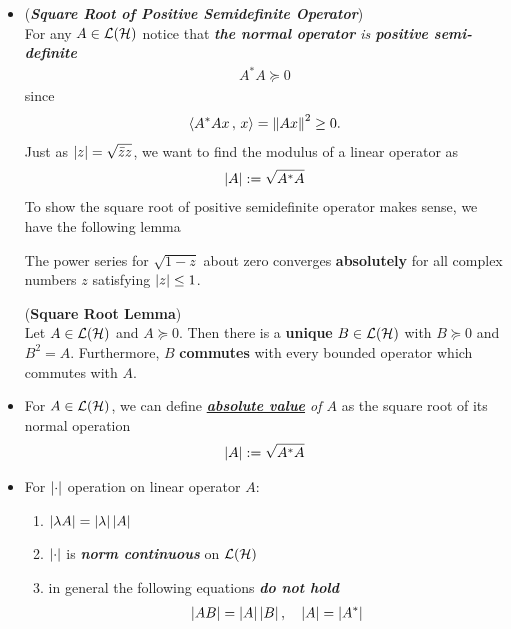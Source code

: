 \documentclass[11pt]{article}
\begin{document}
\begin{itemize}
\item \begin{remark} (\emph{\textbf{Square Root of Positive Semidefinite Operator}})\\
For any $A \in {\mathcal L}({\mathcal H})$ notice that \emph{\textbf{the normal operator} is \textbf{positive semi-definite}}
\begin{align*}
A^{*}A \succeq 0
\end{align*}
since 
\begin{align*}
\left\langle A^{*}Ax\,,\, x \right\rangle = \left\|Ax\right\|_{}^2 \ge 0.
\end{align*}
Just as $\left\lvert z \right\rvert = \sqrt{\bar{z}z}$, we want to find the modulus of a linear operator as
\begin{align*}
\left\lvert A \right\rvert := \sqrt{A^{*}A }
\end{align*} 
To show the square root of positive semidefinite operator makes sense, we have the following lemma
\begin{lemma}
The power series for $\sqrt{1 - z}$ about zero converges \textbf{absolutely} for all complex numbers $z$ satisfying $\left\lvert z \right\rvert \le 1$. 
\end{lemma}

\begin{theorem} (\textbf{Square Root Lemma})  \citep{reed1980methods}\\ 
Let $A \in {\mathcal L}({\mathcal H})$ and $A \succeq 0$. Then there is a \textbf{unique} $B \in {\mathcal L}({\mathcal H})$ with $B \succeq 0$ and $B^2 = A$. Furthermore, $B$ 
\textbf{commutes} with every bounded operator which commutes with $A$. 
\end{theorem}
\end{remark}

\item \begin{definition}
For $A \in {\mathcal L}({\mathcal H})$, we can define \emph{\underline{\textbf{absolute value}} of $A$} as the square root of its normal operation
\begin{align*}
\left\lvert A \right\rvert := \sqrt{A^{*}A }
\end{align*} 
\end{definition}

\item \begin{remark}
For $\left\lvert \cdot \right\rvert$ operation on linear operator $A$:
\begin{enumerate}
\item $\left\lvert \lambda A \right\rvert = \left\lvert \lambda \right\rvert \left\lvert A \right\rvert$
\item $\left\lvert \cdot \right\rvert$ is \emph{\textbf{norm continuous}} on ${\mathcal L}({\mathcal H})$
\item in general the following equations \emph{\textbf{do not hold}}
\begin{align*}
\left\lvert A B \right\rvert = \left\lvert A \right\rvert\left\lvert B \right\rvert, \quad \left\lvert A \right\rvert = \left\lvert A^{*} \right\rvert
\end{align*}
\end{enumerate}
\end{remark}


\end{itemize}
\end{document}
